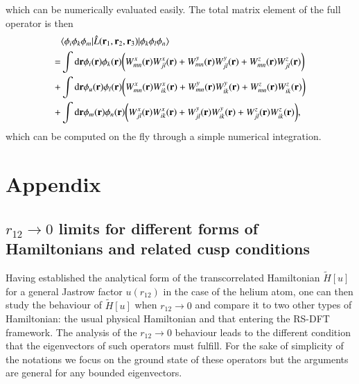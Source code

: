 \documentclass[aip,jcp,reprint,noshowkeys,superscriptaddress]{revtex4-1}
\newcommand{\matelem}[3]{\langle #1 | #2 | #3 \rangle}
\newcommand{\bri}[1]{{\bf r}_{#1}}
\begin{document}
which can be numerically evaluated easily. 
The total matrix element of the full operator is then 
\begin{equation}
 \label{eq:l_ijmkln_final}
 \begin{aligned}
 & \matelem{\phi_i \phi_k \phi_m}{\hat{L}(\bri{1},\bri{2},\bri{3})}{\phi_k \phi_l \phi_n} \\
 = & \int \text{d}{\bf r} \phi_i({\bf r})  \phi_k({\bf r}) \bigg( W_{mn}^x({\bf r}) W_{jl}^x({\bf r}) + W_{mn}^y({\bf r}) W_{jl}^y({\bf r}) + W_{mn}^z({\bf r}) W_{jl}^z({\bf r})\bigg) \\
 + & \int \text{d}{\bf r}\phi_u({\bf r})  \phi_l({\bf r}) \bigg( W_{mn}^x({\bf r}) W_{ik}^x({\bf r}) + W_{mn}^y({\bf r}) W_{ik}^y({\bf r}) + W_{mn}^z({\bf r}) W_{ik}^z({\bf r})\bigg) \\
 + & \int \text{d}{\bf r} \phi_m({\bf r})  \phi_n({\bf r}) \bigg( W_{jl}^x({\bf r}) W_{ik}^x({\bf r}) + W_{jl}^y({\bf r}) W_{ik}^y({\bf r}) + W_{jl}^z({\bf r}) W_{ik}^z({\bf r})\bigg), 
 \end{aligned}
\end{equation}
which can be computed on the fly through a simple numerical integration. 

\section{Appendix}
\subsection{$r_{12} \rightarrow 0$ limits for different forms of Hamiltonians and related cusp conditions}
\label{sec:cusp}
Having established the analytical form of the transcorrelated Hamiltonian $\tilde{H}[u]$ for a general Jastrow factor $u(r_{12})$ in the case of the helium atom, one can then study the behaviour of $\tilde{H}[u]$ when $r_{12}\rightarrow 0$ and compare it to two other types of Hamiltonian: the usual physical Hamiltonian and that entering the RS-DFT framework. 
The analysis of the $r_{12}\rightarrow 0$ behaviour leads to the different condition that the eigenvectors of such operators must fulfill. For the sake of simplicity of the notations we focus on the ground state of these operators but the arguments are general for any bounded eigenvectors. 
\end{document}

